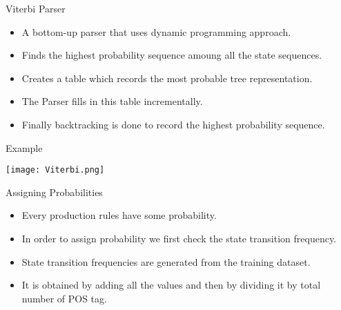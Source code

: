 \documentclass{beamer}
\begin{document}
\begin{frame}{Viterbi Parser}
\begin{itemize}
	\item A bottom-up parser that uses dynamic programming approach.
	\vspace{0.5em}
	\item Finds the highest probability sequence amoung all the state sequences. \\  
	\vspace{0.5em}
	\item Creates a table which records the most probable tree representation. \\
	\vspace{0.5em}
	\item  The Parser fills in this table incrementally.\\
	\vspace{0.5em}
	\item Finally backtracking is done to record the highest probability sequence. 
\end{itemize}
\end{frame}



\begin{frame}{Example}
\begin{center}
	\texttt{[image: Viterbi.png]}	
\end{center}
\end{frame}



\begin{frame}{Assigning Probabilities}
\begin{itemize}
	\item Every production rules have some probability. \\
	\vspace{0.5em}
	\item In order to assign probability we first check the state transition frequency. \\
	\vspace{0.5em}
	\item State transition frequencies are generated from the training dataset. \\
	\vspace{0.5em}
	\item It is obtained by adding all the values and then by dividing it by total number of POS tag. \\
	\vspace{0.5em}                   
\end{itemize}
\end{frame}
\end{document}

